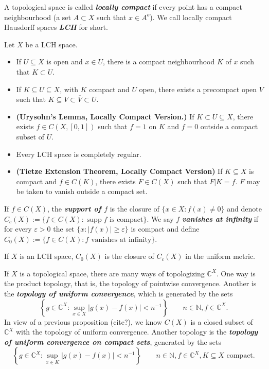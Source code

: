 \documentclass{article}
\theoremstyle{definition}
\numberwithin{equation}{section}
\newcommand{\N}{\mathbb{N}}
\newcommand{\C}{\mathbb{C}}
\begin{document}
	A topological space is called \textbf{\textit{locally compact}} if every point has a compact neighbourhood (a set $A\subset X$ such that $x\in A^o$). We call locally compact Hausdorff spaces \textbf{\textit{LCH}} for short.
	\begin{prop}Let $X$ be a LCH space.
		\begin{itemize}
			\item If $U\subseteq X$ is open and $x\in U$, there is a compact neighbourhood $K$ of $x$ such that $K\subset U$.
			\item If $K\subseteq U\subseteq X$, with $K$ compact and $U$ open, there exists a precompact open $V$ such that $K\subseteq V\subset \overline{V}\subset U$.
			\item \textbf{(Urysohn's Lemma, Locally Compact Version.)} If $K\subset U\subseteq X$, there exists $f\in C(X,[0,1])$ such that $f=1$ on $K$ and $f=0$ outside a compact subset of $U$.
			\item Every LCH space is completely regular.
			\item \textbf{(Tietze Extension Theorem, Locally Compact Version)} If $K\subseteq X$ is compact and $f\in C(K)$, there exists $F\in C(X)$ such that $F|K=f$. $F$ may be taken to vanish outside a compact set.	
		\end{itemize}
	\end{prop}
	If $f\in C(X)$, the \textbf{\textit{support of $f$}} is the closure of $\{x\in X:f(x)\neq0\}$ and denote $C_c(X):=\{f\in C(X):\operatorname{supp}f\text{ is compact}\}$. We say $f$ \textbf{\textit{vanishes at infinity}} if for every $\varepsilon>0$ the set $\{x:|f(x)|\geq\varepsilon\}$ is compact and define $C_0(X):=\{f\in C(X):f\text{ vanishes at infinity}\}$.
	\begin{prop}
		If $X$ is an LCH space, $C_0(X)$ is the closure of $C_c(X)$ in the uniform metric.
	\end{prop}
	If $X$ is a topological space, there are many ways of topologizing $\C^X$. One way is the product topology, that is, the topology of pointwise convergence. Another is the \textbf{\textit{topology of uniform convergence}}, which is generated by the sets
	\[\left\{g\in\C^X:\sup_{x\in X}|g(x)-f(x)|<n^{-1}\right\}\qquad n\in\N,f\in\C^X.\]
	In view of a previous proposition (cite?), we know $C(X)$ is a closed subset of $\C^X$ with the topology of uniform convergence. Another topology is the \textbf{\textit{topology of uniform convergence on compact sets}}, generated by the sets
	\[\left\{g\in\C^X:\sup_{x\in K}|g(x)-f(x)|<n^{-1}\right\}\qquad n\in\N,f\in\C^X,K\subseteq X\text{ compact}.\]
\end{document}
